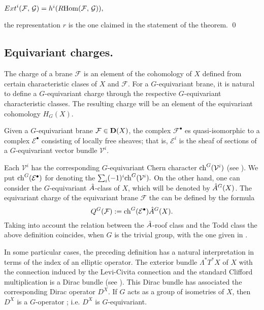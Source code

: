 \documentclass[xypic,amscd,syntonly,amssymb,verbatim,12pt]{amsart}
\theoremstyle{plain}
\theoremstyle{definition}
\theoremstyle{remark}
\numberwithin{equation}{section}
\begin{document}
  ${Ext}^i({\mathcal F},\,{\mathcal G})=h^i(R{\rm Hom}({\mathcal F},\,{\mathcal
  G})),$
   
   the representation  $r$ is the one claimed in the statement of the theorem.
 \qed

\smallskip


 \subsection{ Equivariant charges.}\label{SubsectEqch}  The charge of a brane  ${\mathcal F}$ \cite{Aspin, Harvey, M-M} is an element
  of the cohomology of $X$ defined from certain characteristic clases of $X$ and ${\mathcal F}$.
  For a $G$-equivariant brane, it is natural to define a $G$-equivariant charge through the respective $G$-equivariant
  characteristic classes. The resulting charge will be an element of the equivariant cohomology  $H_G(X)$.

  
 
 Given a $G$-equivariant brane ${\mathcal
 F}\in{\bf D}(X)$, the complex ${\mathcal F}^{\bullet}$ es
 quasi-isomorphic to a complex ${\mathcal E}^{\bullet}$ consisting of
 locally free sheaves; that is, ${\mathcal E}^i$ is the sheaf of
 sections of a $G$-equivariant  vector bundle ${\mathcal V}^i$.

Each ${\mathcal V}^i$ has the corresponding $G$-equivariant Chern
character ${\rm ch}^G({\mathcal V}^i)$ (see \cite[page
212]{B-G-V}). We put ${\rm ch}^G({\mathcal E}^{\bullet})$ for
denoting the $\sum_i (-1)^i{\rm ch}^G({\mathcal V}^i).$ On the
other hand, one can consider the $G$-equivariant $\Hat A$-class of
$X$, which will be denoted by $\Hat A^G(X)$. The equivariant
charge of the equivariant brane ${\mathcal  F}$ the can be defined
by the formula
 \begin{equation}\label{EquiCharge}
Q^G({\mathcal F}):= {\rm ch}^G({\mathcal E}^{\bullet})\Hat A^G(X).
 \end{equation}
 Taking into account the relation between the $\Hat A$-roof class
 and the Todd class \cite[page 231]{L-M} the above
 definition coincides, when   $G$ is the trivial group,
 with the one given in \cite{Aspin}.


 In some particular cases, the preceding definition has a natural interpretation
 in terms of the index  of an elliptic operator.
 The exterior bundle $\Lambda^*T^*X$  of $X$ with the connection
 induced by the Levi-Civita connection  and the standard
 Clifford multiplication  is a Dirac bundle (see \cite[page 114]{L-M}). This Dirac bundle
 has associated the corresponding Dirac operator $D^X$. If $G$ acts as a group of isometries
  of $X$, then $D^X$ is a $G$-operator \cite[page 211]{L-M}; i.e. $D^X$ is $G$-equivariant.
\end{document}
